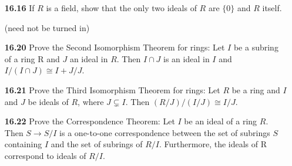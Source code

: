 \documentclass[12pt,reqno]{amsart}
\newcommand{\<}{\ensuremath{\langle}}
\renewcommand{\>}{\ensuremath{\rangle}}
\newcommand{\probskip}{\vskip1cm}
\begin{document}
\begin{enumerate}
\probskip

\item[{\bf 16.16}] If $R$ is a field, show that the only two ideals of $R$ are $\{0\}$ and $R$ itself.


\probskip

 (need not be turned in)
  
\item[{\bf 16.20}] 
Prove the Second Isomorphism Theorem for rings: Let $I$ be a subring of a ring R
and $J$ an ideal in $R$. Then $I \cap J$ is an ideal in $I$ and $I/(I \cap J) \cong
I + J/J$.

\probskip

\item[{\bf 16.21}] Prove the Third Isomorphism Theorem for rings: Let $R$ be a ring and $I$ and $J$ be
ideals of $R$, where $J \subsetneq I$. Then
$(R/J)/ (I/J) \cong I/J$.

\probskip

\item[{\bf 16.22}] Prove the Correspondence Theorem: Let $I$ be an ideal of a ring $R$. 
Then $S \to S/I$ is a one-to-one correspondence between the set of subrings $S$ containing 
$I$ and the set of subrings of $R/I$. Furthermore, the ideals of R correspond to ideals of $R/I$.


 
\end{enumerate}
\end{document}
